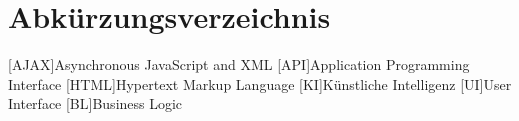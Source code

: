 \section*{Abkürzungsverzeichnis}
\begin{acronym}
	[AJAX]{Asynchronous JavaScript and XML}
	[API]{Application Programming Interface}
	[HTML]{Hypertext Markup Language}
	[KI]{Künstliche Intelligenz}
	[UI]{User Interface}
	[BL]{Business Logic}
\end{acronym}
